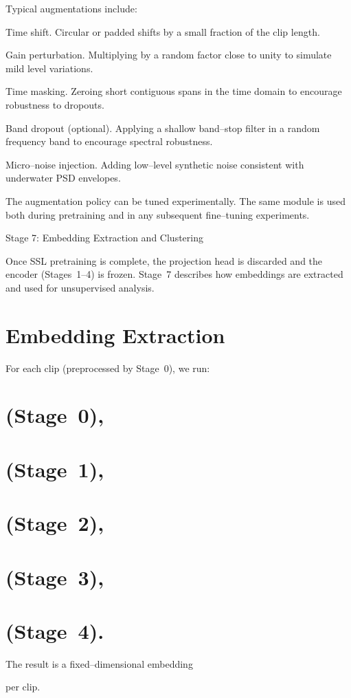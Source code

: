 \documentclass[12pt]{article}
\begin{document}
Typical augmentations include:

Time shift. Circular or padded shifts by a small fraction of the clip length.

Gain perturbation. Multiplying by a random factor close to unity to simulate mild level variations.

Time masking. Zeroing short contiguous spans in the time domain to encourage robustness to dropouts.

Band dropout (optional). Applying a shallow band–stop filter in a random frequency band to encourage spectral robustness.

Micro–noise injection. Adding low–level synthetic noise consistent with underwater PSD envelopes.

The augmentation policy can be tuned experimentally. The same module is used both during pretraining and in any subsequent fine–tuning experiments.

Stage 7: Embedding Extraction and Clustering

Once SSL pretraining is complete, the projection head is discarded and the encoder (Stages 1–4) is frozen. Stage 7 describes how embeddings are extracted and used for unsupervised analysis.

\section*{Embedding Extraction}
For each clip  (preprocessed by Stage 0), we run:

\section*{(Stage 0),}
\section*{(Stage 1),}
\section*{(Stage 2),}
\section*{(Stage 3),}
\section*{(Stage 4).}
The result is a fixed–dimensional embedding


per clip.
\end{document}
